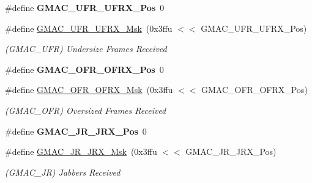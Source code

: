 \begin{DoxyCompactItemize}
\mbox{\label{group__SAME70__GMAC_ga5cc67bf35b11a3722d638f84f9ee75b5}} 
\#define {\bfseries G\+M\+A\+C\+\_\+\+U\+F\+R\+\_\+\+U\+F\+R\+X\+\_\+\+Pos}~0
\item 
\mbox{\label{group__SAME70__GMAC_gac817943c6d2d169e5aa703fd924bfa60}} 
\#define \mbox{\hyperlink{group__SAME70__GMAC_gac817943c6d2d169e5aa703fd924bfa60}{G\+M\+A\+C\+\_\+\+U\+F\+R\+\_\+\+U\+F\+R\+X\+\_\+\+Msk}}~(0x3ffu $<$$<$ G\+M\+A\+C\+\_\+\+U\+F\+R\+\_\+\+U\+F\+R\+X\+\_\+\+Pos)
\begin{DoxyCompactList}\small\item\em (G\+M\+A\+C\+\_\+\+U\+FR) Undersize Frames Received \end{DoxyCompactList}\item 
\mbox{\label{group__SAME70__GMAC_ga376d825ea8a0eea1e84facc4a9830be1}} 
\#define {\bfseries G\+M\+A\+C\+\_\+\+O\+F\+R\+\_\+\+O\+F\+R\+X\+\_\+\+Pos}~0
\item 
\mbox{\label{group__SAME70__GMAC_ga013b88793d12a5cca266c2e3e953bf2e}} 
\#define \mbox{\hyperlink{group__SAME70__GMAC_ga013b88793d12a5cca266c2e3e953bf2e}{G\+M\+A\+C\+\_\+\+O\+F\+R\+\_\+\+O\+F\+R\+X\+\_\+\+Msk}}~(0x3ffu $<$$<$ G\+M\+A\+C\+\_\+\+O\+F\+R\+\_\+\+O\+F\+R\+X\+\_\+\+Pos)
\begin{DoxyCompactList}\small\item\em (G\+M\+A\+C\+\_\+\+O\+FR) Oversized Frames Received \end{DoxyCompactList}\item 
\mbox{\label{group__SAME70__GMAC_ga3263fc3f0218d9460883c3034540ab87}} 
\#define {\bfseries G\+M\+A\+C\+\_\+\+J\+R\+\_\+\+J\+R\+X\+\_\+\+Pos}~0
\item 
\mbox{\label{group__SAME70__GMAC_ga20b51984f32d5d083b0ae4ebdca3ff41}} 
\#define \mbox{\hyperlink{group__SAME70__GMAC_ga20b51984f32d5d083b0ae4ebdca3ff41}{G\+M\+A\+C\+\_\+\+J\+R\+\_\+\+J\+R\+X\+\_\+\+Msk}}~(0x3ffu $<$$<$ G\+M\+A\+C\+\_\+\+J\+R\+\_\+\+J\+R\+X\+\_\+\+Pos)
\begin{DoxyCompactList}\small\item\em (G\+M\+A\+C\+\_\+\+JR) Jabbers Received \end{DoxyCompactList}\item 
$$
\end{DoxyCompactItemize}
